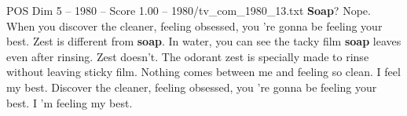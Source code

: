 \begin{textsample}{POS Dim 5 – 1980 – Score 1.00 – 1980/tv\_com\_1980\_13.txt}  \label{ex:f5_pos_010}
\textbf{Soap}?
Nope.
When you discover the cleaner, feeling obsessed, you 're gonna be feeling your best.
Zest is different from \textbf{soap}.
In water, you can see the tacky film \textbf{soap} leaves even after rinsing.
Zest doesn't.
The odorant zest is specially made to rinse without leaving sticky film.
Nothing comes between me and feeling so clean.
I feel my best.
Discover the cleaner, feeling obsessed, you 're gonna be feeling your best.
I 'm feeling my best.

\end{textsample}

